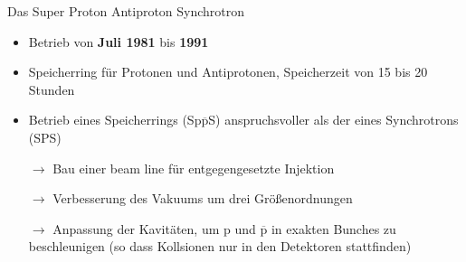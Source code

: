 \documentclass[aspectratio=1610, professionalfonts, 10pt]{beamer}
\begin{document}
\begin{frame}{Das Super Proton Antiproton Synchrotron}
				\begin{itemize}
					\setlength\itemsep{0.5em}
					\item Betrieb von \textbf{Juli 1981} bis \textbf{1991}
					\item Speicherring für Protonen und Antiprotonen, Speicherzeit von 15 bis 20 Stunden
					\item Betrieb eines Speicherrings (Sp$\overline{\text{p}}$S) anspruchsvoller als der eines Synchrotrons (SPS)
					\item[$\rightarrow$] Bau einer beam line für entgegengesetzte Injektion
					\item[$\rightarrow$] Verbesserung des Vakuums um drei Grö{\ss}enordnungen
					\item[$\rightarrow$] Anpassung der Kavitäten, um p und $\overline{\text{p}}$ in exakten Bunches zu beschleunigen (so dass Kollsionen nur in den Detektoren stattfinden)
				\end{itemize}
\end{frame}
\end{document}
